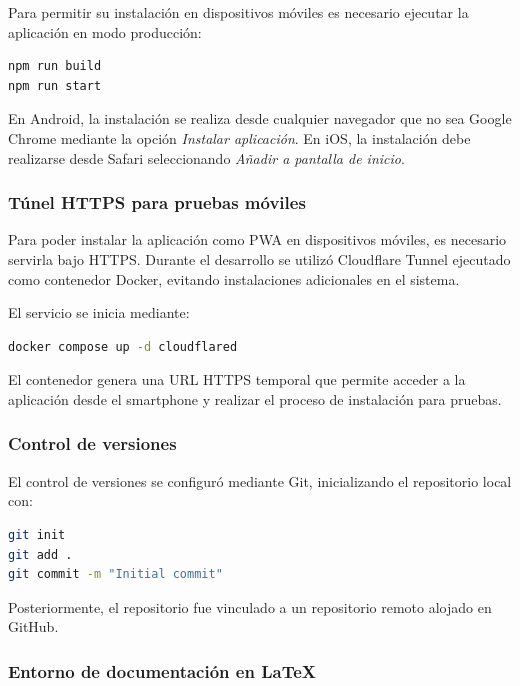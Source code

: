 Para permitir su instalación en dispositivos móviles es necesario ejecutar la aplicación en modo producción:

\begin{lstlisting}[language=bash]
npm run build
npm run start
\end{lstlisting}

En Android, la instalación se realiza desde cualquier navegador que no sea Google Chrome mediante la opción \textit{Instalar aplicación}.  
En iOS, la instalación debe realizarse desde Safari seleccionando \textit{Añadir a pantalla de inicio}.

\subsubsection*{Túnel HTTPS para pruebas móviles}

Para poder instalar la aplicación como PWA en dispositivos móviles, es necesario servirla bajo HTTPS. Durante el desarrollo se utilizó Cloudflare Tunnel ejecutado como contenedor Docker, evitando instalaciones adicionales en el sistema.

El servicio se inicia mediante:

\begin{lstlisting}[language=bash]
docker compose up -d cloudflared
\end{lstlisting}

El contenedor genera una URL HTTPS temporal que permite acceder a la aplicación desde el smartphone y realizar el proceso de instalación para pruebas.

\subsubsection*{Control de versiones}

El control de versiones se configuró mediante Git, inicializando el repositorio local con:

\begin{lstlisting}[language=bash]
git init
git add .
git commit -m "Initial commit"
\end{lstlisting}

Posteriormente, el repositorio fue vinculado a un repositorio remoto alojado en GitHub.

\subsubsection*{Entorno de documentación en \LaTeX}

